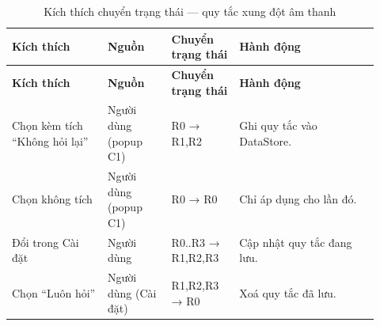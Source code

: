 \begin{longtable}{>{\RaggedRight\arraybackslash}p{0.24\linewidth}>{\RaggedRight\arraybackslash}p{0.16\linewidth}>{\RaggedRight\arraybackslash}p{0.17\linewidth}>{\RaggedRight\arraybackslash}p{0.35\linewidth}}
\caption{Kích thích chuyển trạng thái — quy tắc xung đột âm thanh}
\label{tab:state-rule-stim}\\
\toprule
\textbf{Kích thích} & \textbf{Nguồn} & \textbf{Chuyển trạng thái} & \textbf{Hành động} \\
\midrule
\endfirsthead
\toprule
\textbf{Kích thích} & \textbf{Nguồn} & \textbf{Chuyển trạng thái} & \textbf{Hành động} \\
\midrule
\endhead
\bottomrule
\endfoot
Chọn kèm tích “Không hỏi lại” & Người dùng (popup C1) & R0 → R1,R2 & Ghi quy tắc vào DataStore. \\
Chọn không tích & Người dùng (popup C1) & R0 → R0 & Chỉ áp dụng cho lần đó. \\
Đổi trong Cài đặt & Người dùng & R0..R3 → R1,R2,R3 & Cập nhật quy tắc đang lưu. \\
Chọn “Luôn hỏi” & Người dùng (Cài đặt) & R1,R2,R3 → R0 & Xoá quy tắc đã lưu. \\
\end{longtable}
\endgroup

